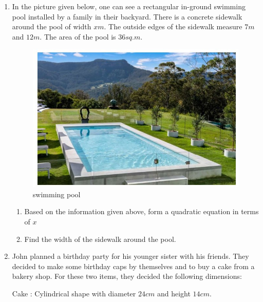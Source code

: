 \begin{enumerate}
\item In the picture given below, one can see a rectangular in-ground swimming pool installed by a family in their backyard. There is a concrete sidewalk around the pool of width $x m$. The outside edges of the sidewalk measure $7 m$ and $12 m$. The area of the pool is $36 sq. m$.
\begin{figure}[H]
    \centering
    \includegraphics[width=\columnwidth]{figs/swimming pool.png}
    \caption{swimming pool}
    \label{fig:swimming pool}
\end{figure}
\begin{enumerate}
    \item Based on the information given above, form a quadratic equation in terms of $x$
    \item Find the width of the sidewalk around the pool.
\end{enumerate}

\item John planned a birthday party for his younger sister with his friends. They decided to make some birthday caps by themselves and to buy a cake from a bakery shop. For these two items, they decided the following dimensions:

Cake : Cylindrical shape with diameter $24 cm$ and height $14 cm.$


\end{enumerate}
